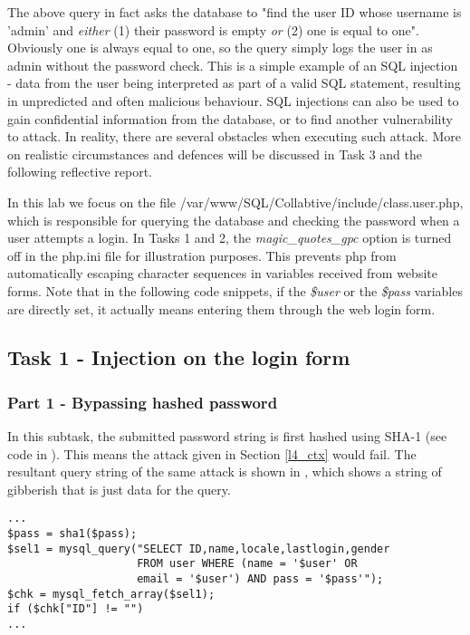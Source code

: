The above query in fact asks the database to "find the user ID whose username is 'admin' and \emph{either} (1) their password is empty \emph{or} (2) one is equal to one". Obviously one is always equal to one, so the query simply logs the user in as admin without the password check. This is a simple example of an SQL injection - data from the user being interpreted as part of a valid SQL statement, resulting in unpredicted and often malicious behaviour. SQL injections can also be used to gain confidential information from the database, or to find another vulnerability to attack. In reality, there are several obstacles when executing such attack. More on realistic circumstances and defences will be discussed in Task 3 and the following reflective report.

In this lab we focus on the file /var/www/SQL/Collabtive/include/class.user.php, which is responsible for querying the database and checking the password when a user attempts a login. In Tasks 1 and 2, the \emph{magic\_quotes\_gpc} option is turned off in the php.ini file for illustration purposes. This prevents php from automatically escaping character sequences in variables received from website forms. Note that in the following code snippets, if the \emph{\$user} or the \emph{\$pass} variables are directly set, it actually means entering them through the web login form.

\subsection{Task 1 - Injection on the login form} \label{l4_t1}
\subsubsection{Part 1 - Bypassing hashed password} \label{l4_t1p1}
In this subtask, the submitted password string is first hashed using SHA-1 (see code in ). This means the attack given in Section \ref{l4_ctx} would fail. The resultant query string of the same attack is shown in , which shows a string of gibberish that is just data for the query.

\begin{minipage}{\linewidth}
\begin{lstlisting}[caption={Vulnerable SQL login statement},
label={lst:l4_t1p1_vulnstm},
frame=single]
...
$pass = sha1($pass);
$sel1 = mysql_query("SELECT ID,name,locale,lastlogin,gender
                    FROM user WHERE (name = '$user' OR
                    email = '$user') AND pass = '$pass'");
$chk = mysql_fetch_array($sel1);
if ($chk["ID"] != "")
...
\end{lstlisting}
\end{minipage}

